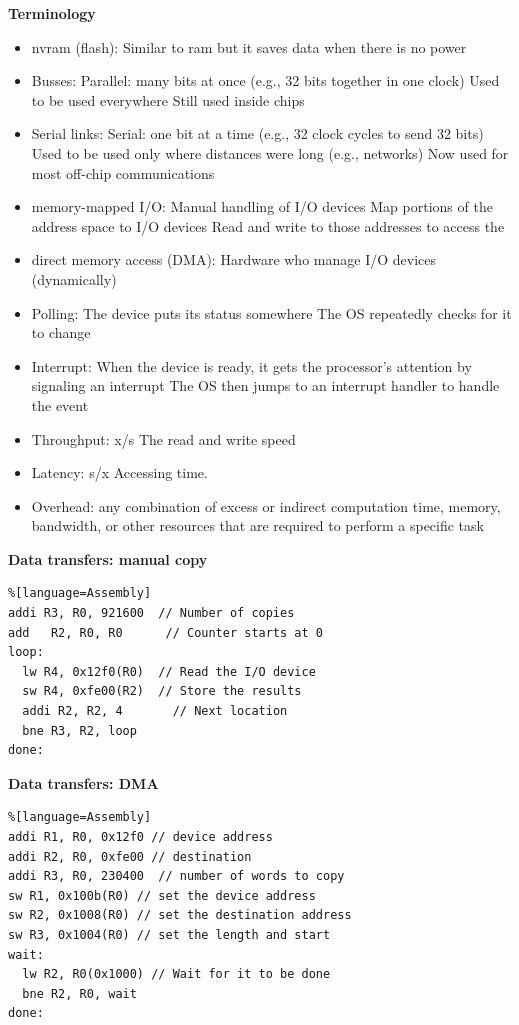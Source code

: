 \textbf{Terminology}
\begin{itemize}
\item  nvram (flash): Similar to ram but it saves data when there is no power
\item  Busses:
  Parallel: many bits at once (e.g., 32 bits together in one clock)
  Used to be used everywhere
  Still used inside chips
\item  Serial links:
  Serial: one bit at a time (e.g., 32 clock cycles to send 32 bits)
  Used to be used only where distances were long (e.g., networks)
  Now used for most off-chip communications
\item  memory-mapped I/O:
  Manual handling of I/O devices
  Map portions of the address space to I/O devices
  Read and write to those addresses to access the 
\item  direct memory access (DMA):
  Hardware who manage I/O devices (dynamically)
\item  Polling:
  The device puts its status somewhere
  The OS repeatedly checks for it to change
\item  Interrupt:
  When the device is ready, it gets the processor’s attention by signaling an interrupt
  The OS then jumps to an interrupt handler to handle the event
\item  Throughput: x/s
  The read and write speed
\item  Latency: s/x
  Accessing time.
\item  Overhead:
  any combination of excess or 
  indirect computation time, memory, bandwidth,
  or other resources that are required to perform a specific task
\end{itemize}



\textbf{Data transfers: manual copy}
\begin{lstlisting}%[language=Assembly]
addi R3, R0, 921600  // Number of copies
add   R2, R0, R0      // Counter starts at 0
loop:
  lw R4, 0x12f0(R0)  // Read the I/O device
  sw R4, 0xfe00(R2)  // Store the results
  addi R2, R2, 4       // Next location
  bne R3, R2, loop
done:
\end{lstlisting}


\textbf{Data transfers: DMA}
\begin{lstlisting}%[language=Assembly]
addi R1, R0, 0x12f0 // device address
addi R2, R0, 0xfe00 // destination
addi R3, R0, 230400  // number of words to copy
sw R1, 0x100b(R0) // set the device address
sw R2, 0x1008(R0) // set the destination address
sw R3, 0x1004(R0) // set the length and start
wait:
  lw R2, R0(0x1000) // Wait for it to be done
  bne R2, R0, wait
done:
\end{lstlisting}


